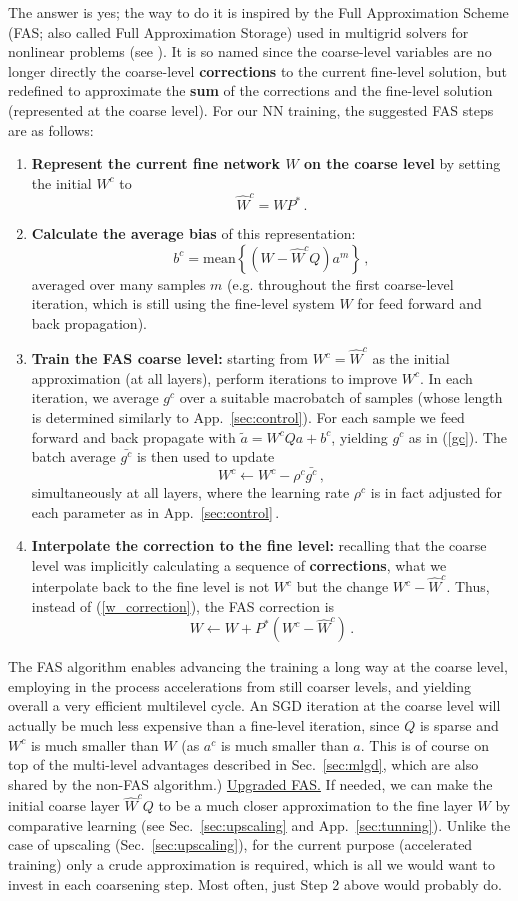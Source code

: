 \documentclass{article} %
\begin{document}
The answer is yes; the way to do it is inspired by the Full Approximation Scheme (FAS; also called Full Approximation Storage) used in multigrid solvers for nonlinear problems (see \cite{3}). It is so named since the coarse-level variables are no longer directly the coarse-level \textbf{corrections} to the current fine-level solution, but redefined to approximate the \textbf{sum} of the corrections and the fine-level solution (represented at the coarse level). For our NN training, the suggested FAS steps are as follows:
\begin{enumerate}
	\item \textbf{Represent the current fine network $W$ on the coarse level} by setting the initial $W^c$ to
	$$ \hat{W}^c = W P^*\,. $$
	\item \textbf{Calculate the average bias} of this representation:
	$$ b^c = {\mbox{mean}}\left\{ \left( W - \hat{W}^c Q \right) a^m \right\}\,, $$
averaged over many samples $m$ (e.g. throughout the first coarse-level iteration, which is still using the fine-level system $W$ for feed forward and back propagation).
	\item \textbf{Train the FAS coarse level:} starting from $W^c = \hat{W}^c$ as the initial approximation (at all layers), perform iterations to improve $W^c$. In each iteration, we average $g^c$ over a suitable macrobatch of samples (whose length is determined similarly to App.~\ref{sec:control}). For each sample we feed forward and back propagate with $\tilde{a} = W^c Q a + b^c$, yielding $g^c$ as in (\ref{gc}). The batch average $\bar{g^c}$ is then used to update
	$$ W^c \longleftarrow W^c - \rho^c \bar{g^c}\,, $$
	simultaneously at all layers, where the learning rate $\rho^c$ is in fact adjusted for each parameter as in App.~\ref{sec:control}\,.
	\item \textbf{Interpolate the correction to the fine level:} recalling that the coarse level was implicitly calculating a sequence of \textbf{corrections}, what we interpolate back to the fine level is not $W^c$ but the change $W^c - \hat{W}^c$. Thus, instead of (\ref{w_correction}), the FAS correction is
	$$ W \longleftarrow W + P^* \left( W^c - \hat{W}^c \right)\,. $$
\end{enumerate}

The FAS algorithm enables advancing the training a long way at the coarse level, employing in the process accelerations from still coarser levels, and yielding overall a very efficient multilevel cycle. An SGD iteration at the coarse level will actually be much less expensive than a fine-level iteration, since $Q$ is sparse and $W^c$ is much smaller than $W$ (as $a^c$ is much smaller than $a$. This is of course on top of the multi-level advantages described in Sec.~\ref{sec:mlgd}, which are also shared by the non-FAS algorithm.)
\underline{Upgraded FAS.} If needed, we can make the initial coarse layer $\hat{W}^c Q$ to be a much closer approximation to the fine layer $W$ by comparative learning (see Sec.~\ref{sec:upscaling} and App.~\ref{sec:tunning}). Unlike the case of upscaling (Sec.~\ref{sec:upscaling}), for the current purpose (accelerated training) only a crude approximation is required, which is all we would want to invest in each coarsening step. Most often, just Step 2 above would probably do.
\end{document}
